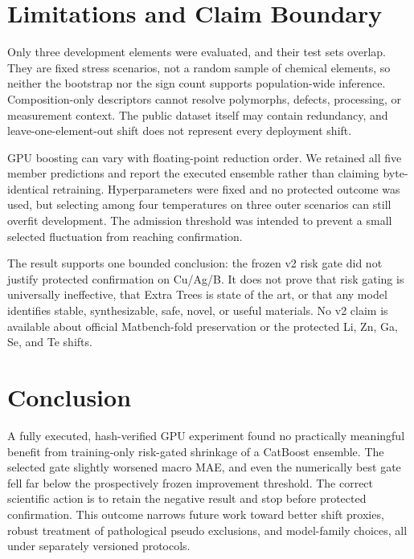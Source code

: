 \documentclass[11pt]{article}
\begin{document}
\section{Limitations and Claim Boundary}
Only three development elements were evaluated, and their test sets overlap.
They are fixed stress scenarios, not a random sample of chemical elements, so
neither the bootstrap nor the sign count supports population-wide inference.
Composition-only descriptors cannot resolve polymorphs, defects, processing,
or measurement context. The public dataset itself may contain redundancy, and
leave-one-element-out shift does not represent every deployment shift.

GPU boosting can vary with floating-point reduction order. We retained all five
member predictions and report the executed ensemble rather than claiming
byte-identical retraining. Hyperparameters were fixed and no protected outcome
was used, but selecting among four temperatures on three outer scenarios can
still overfit development. The admission threshold was intended to prevent a
small selected fluctuation from reaching confirmation.

The result supports one bounded conclusion: the frozen v2 risk gate did not
justify protected confirmation on Cu/Ag/B. It does not prove that risk gating is
universally ineffective, that Extra Trees is state of the art, or that any model
identifies stable, synthesizable, safe, novel, or useful materials. No v2 claim
is available about official Matbench-fold preservation or the protected Li, Zn,
Ga, Se, and Te shifts.

\section{Conclusion}
A fully executed, hash-verified GPU experiment found no practically meaningful
benefit from training-only risk-gated shrinkage of a CatBoost ensemble. The
selected gate slightly worsened macro MAE, and even the numerically best gate
fell far below the prospectively frozen improvement threshold. The correct
scientific action is to retain the negative result and stop before protected
confirmation. This outcome narrows future work toward better shift proxies,
robust treatment of pathological pseudo exclusions, and model-family choices,
all under separately versioned protocols.
\end{document}
